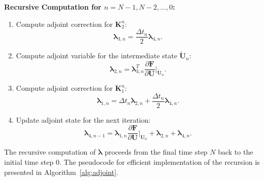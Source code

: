 \textbf{Recursive Computation for \( n = N-1, N-2, \dots, 0 \):}
\begin{enumerate}
    \item Compute adjoint correction for \( \mathbf{K}_2^n \):
    \begin{equation}
    \boldsymbol{\lambda}_{3,n} = \frac{\Delta t_n}{2} \boldsymbol{\lambda}_{4,n}.
    \end{equation}

    \item Compute adjoint variable for the intermediate state \( \widetilde{\mathbf{U}}_n \):
    \begin{equation}
    \boldsymbol{\lambda}_{2,n} = \boldsymbol{\lambda}_{3,n}^T \frac{\partial \mathbf{F}}{\partial \mathbf{U}} \Big|_{\widetilde{\mathbf{U}}_n}.
    \end{equation}

    \item Compute adjoint correction for \( \mathbf{K}_1^n \):
    \begin{equation}
    \boldsymbol{\lambda}_{1,n} = \Delta t_n \boldsymbol{\lambda}_{2,n} + \frac{\Delta t_n}{2} \boldsymbol{\lambda}_{4,n}.
    \end{equation}

    \item Update adjoint state for the next iteration:
    \begin{equation}
    \boldsymbol{\lambda}_{4,n-1} = \boldsymbol{\lambda}_{1,n} \frac{\partial \mathbf{F}}{\partial \mathbf{U}} \Big|_{\mathbf{U}_n} + \boldsymbol{\lambda}_{2,n} + \boldsymbol{\lambda}_{4,n}.
    \end{equation}
\end{enumerate}
The recursive computation of \(\boldsymbol{\lambda}\) proceeds from the final time step \(N\) back to the initial time step \(0\). The pseudocode for efficient implementation of the recursion is presented in Algorithm~\ref{alg:adjoint}.


